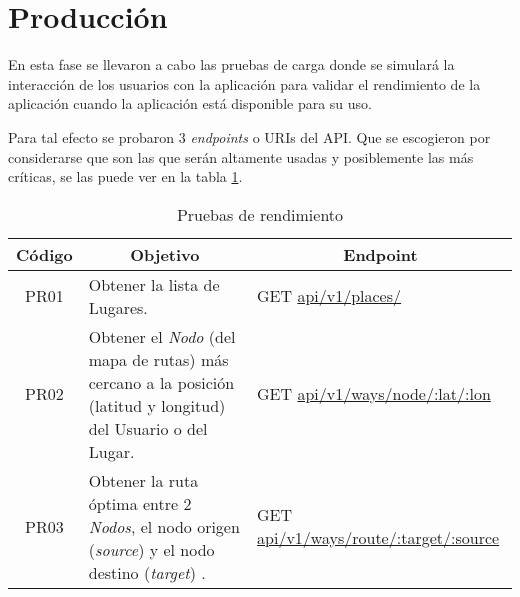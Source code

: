 \section{Producción}

En esta fase se llevaron a cabo las pruebas de carga donde se simulará la interacción de los usuarios con la aplicación para validar el rendimiento de la aplicación cuando la aplicación está disponible para su uso.

 Para tal efecto se probaron 3 \emph{endpoints} o URIs del API. Que se escogieron por considerarse que son las que serán altamente usadas y posiblemente las más críticas, se las puede ver en la tabla \ref{tab:tests_rendimiento}.


 \begin{table}[H]
   \begin{center}
     \begin{tabularx}{0.9\textwidth}{ c X  X }
       \toprule
       \textbf{C\'odigo} &
         \multicolumn{1}{c}{\textbf{Objetivo}} &
         \multicolumn{1}{c}{\textbf{Endpoint}} \\

\midrule
PR01 &
Obtener la lista de Lugares.
&
GET \url{api/v1/places/} \\

 \addlinespace
 PR02 &
 Obtener el \emph{Nodo} (del mapa de rutas) más cercano a la posición (latitud y longitud) del Usuario o del Lugar.
 &
 GET \url{api/v1/ways/node/:lat/:lon} \\


  \addlinespace
  PR03 &
  Obtener la ruta óptima entre 2 \emph{Nodos}, el nodo origen (\emph{source}) y el nodo destino (\emph{target}) .
  &
  GET \url{api/v1/ways/route/:target/:source} \\

       \bottomrule
     \end{tabularx}
     \caption{Pruebas de rendimiento}
     \label{tab:tests_rendimiento}
   \end{center}
 \end{table}


